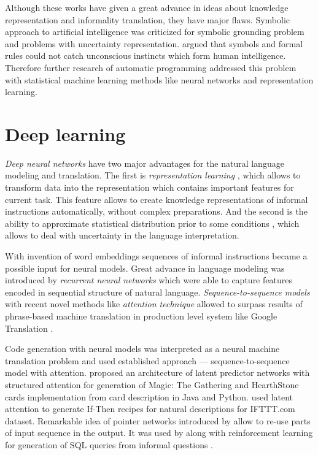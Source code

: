 Although these works have given a great advance in ideas about knowledge representation and informality translation, they have major flaws. Symbolic approach to artificial intelligence was criticized \parencite{mcdermott1987critique, harnad1990symbol} for symbolic grounding problem and problems with uncertainty representation. \cite{dreyfus1994computers} argued that symbols and formal rules could not catch unconscious instincts which form human intelligence. Therefore further research of automatic programming addressed this problem with statistical machine learning methods like neural networks and representation learning.

\section{Deep learning} 
\emph{Deep neural networks} have two major advantages for the natural language modeling and translation. The first is \emph{representation learning} \parencite{Bengio2013}, which allows to transform data into the representation which contains important features for current task. This feature allows to create knowledge representations of informal instructions automatically, without complex preparations. And the second is the ability to approximate statistical distribution prior to some conditions \parencite{white1992artificial}, which allows to deal with uncertainty in the language interpretation. 

With invention of word embeddings \parencite{bengio2003neural} sequences of informal instructions became a possible input for neural models. Great advance in language modeling was introduced by \emph{recurrent neural networks} \parencite{sundermeyer2012lstm, hochreiter1997long, Jozefowicz2016, Gers2001} which were able to capture features encoded in sequential structure of natural language. \emph{Sequence-to-sequence models} \parencite{NIPS2014_5346} with recent novel methods like \emph{attention technique} \parencite{Luong2015, Jean2014, Bahdanau2014} allowed to surpass results of phrase-based machine translation in production level system like Google Translation \parencite{Wu2016}. 

Code generation with neural models was interpreted as a neural machine translation problem and used established approach --- sequence-to-sequence model with attention. \cite{Ling2016} proposed an architecture of latent predictor networks with structured attention for generation of Magic: The Gathering and HearthStone cards implementation from card description in Java and Python. \cite{Chen2016} used latent attention to generate If-Then recipes for natural descriptions for IFTTT.com dataset. Remarkable idea of pointer networks introduced by \cite{NIPS2015_5866} allow to re-use parts of input sequence in the output. It was used by \cite{Zhong2017} along with reinforcement learning for generation of SQL queries from informal questions \parencite{Bhoopchand2016}. 

